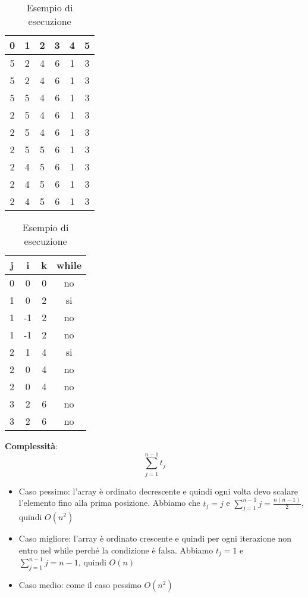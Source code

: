 \begin{table}[h]
	\centering
	\begin{tabular}{ |c|c|c|c|c|c| }
		\hline
		0 & 1 & 2 & 3 & 4 & 5 \\
		\hline
		5 & 2 & 4 & 6 & 1 & 3 \\
		\hline 
		5 & 2 & 4 & 6 & 1 & 3 \\
		\hline 
		5 & 5 & 4 & 6 & 1 & 3 \\
		\hline 
		2 & 5 & 4 & 6 & 1 & 3 \\
		\hline 
		2 & 5 & 4 & 6 & 1 & 3 \\
		\hline 
		2 & 5 & 5 & 6 & 1 & 3 \\
		\hline 
		2 & 4 & 5 & 6 & 1 & 3 \\
		\hline 
		2 & 4 & 5 & 6 & 1 & 3 \\
		\hline 
		2 & 4 & 5 & 6 & 1 & 3 \\
		\hline 
	\end{tabular}
	\begin{tabular} { |c|c|c|c|}
		\hline
		j & i & k & while \\
		\hline
		0 & 0 & 0 & no \\
		\hline
		1 & 0 & 2 & si \\
		\hline
		1 & -1 & 2 & no \\
		\hline
		1 & -1 & 2 & no \\
		\hline
		2 & 1 & 4 & si \\
		\hline
		2 & 0 & 4 & no \\
		\hline
		2 & 0 & 4 & no \\
		\hline
		3 & 2 & 6 & no \\
		\hline
		3 & 2 & 6 & no \\
		\hline
	\end{tabular}
	\caption{Esempio di esecuzione}
\end{table}
\textbf{Complessità}:
\begin{equation}
	\sum\limits_{j=1}^{n-1} t_j
\end{equation}
\begin{itemize}
	\item Caso pessimo: l'array è ordinato decrescente e quindi ogni volta devo scalare l'elemento fino alla prima posizione. Abbiamo che $t_j = j$ e $\sum\limits_{j=1}^{n-1} j = \frac{n(n-1)}{2}$, quindi $O(n^2)$
	\item Caso migliore: l'array è ordinato crescente e quindi per ogni iterazione non entro nel while perché la condizione è falsa. Abbiamo $t_j = 1$ e $\sum\limits_{j=1}^{n-1} j = n-1$, quindi $O(n)$
	\item Caso medio: come il caso pessimo $O(n^2)$
\end{itemize}
